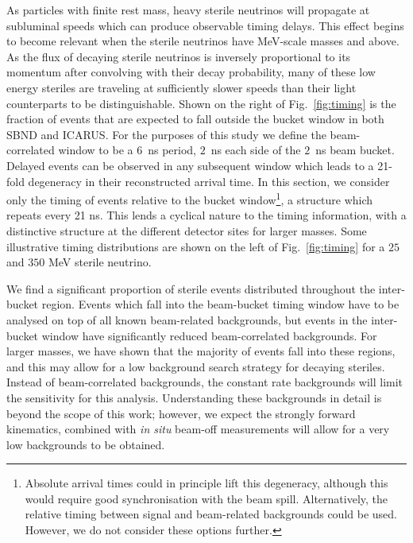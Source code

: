 \documentclass[11pt, a4paper]{article}
\newcommand{\reffig}[1]{Fig.~\ref{#1}}
\def\muboone{MicroBooNE}
\begin{document}
As particles with finite rest mass, heavy sterile neutrinos will propagate at
subluminal speeds which can produce observable timing delays.  This effect
begins to become relevant when the sterile neutrinos have MeV-scale masses and
above. As the flux of decaying sterile neutrinos is inversely proportional to
its momentum after convolving with their decay probability, many of these low
energy steriles are traveling at sufficiently slower speeds than their light
counterparts to be distinguishable. Shown on the right of \reffig{fig:timing}
is the fraction of events that are expected to fall outside the  bucket window
in both SBND and ICARUS. For the purposes of this study we define the
beam-correlated window to be a $6$~ns period, $2$~ns each side of the $2$~ns
beam bucket.
%
Delayed events can be observed in any subsequent window which leads to a
21-fold degeneracy in their reconstructed arrival time. In this
section, we consider only the timing of events relative to the
bucket window\footnote{Absolute
arrival times could in principle lift this degeneracy, although this would
require good synchronisation with the beam spill. Alternatively, the relative
timing between signal and beam-related backgrounds could be used. However, we
do not consider these options further.}, a structure which repeats every 21 ns. This lends a cyclical nature to the
timing information, with a distinctive structure at the different detector
sites for larger masses. Some illustrative timing distributions are shown on
the left of \reffig{fig:timing} for a $25$ and $350$ MeV sterile neutrino.
%

We find a significant proportion of sterile events distributed throughout the
inter-bucket region. Events which fall into the beam-bucket timing window have
to be analysed on top of all known beam-related backgrounds, but events in the
inter-bucket window have significantly reduced beam-correlated backgrounds. 
%
For larger masses, we have shown that the majority of events fall into these
regions, and this may allow for a low background search strategy for decaying
steriles. Instead of beam-correlated backgrounds, the constant rate backgrounds
will limit the sensitivity for this analysis. Understanding these backgrounds
in detail is beyond the scope of this work; however, we expect the strongly
forward kinematics, combined with \emph{in situ} beam-off measurements will allow
for a very low backgrounds to be obtained.

\end{document}
